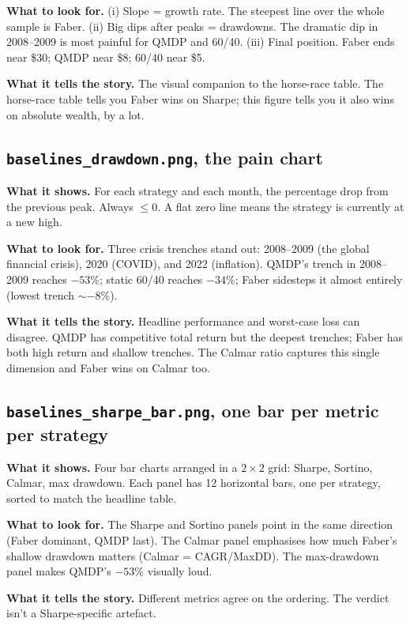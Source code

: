 \documentclass[11pt]{article}
\begin{document}
\textbf{What to look for.} (i) Slope = growth rate. The steepest line over the whole sample is Faber. (ii) Big dips after peaks = drawdowns. The dramatic dip in 2008--2009 is most painful for QMDP and 60/40. (iii) Final position. Faber ends near \$30; QMDP near \$8; 60/40 near \$5.

\textbf{What it tells the story.} The visual companion to the horse-race table. The horse-race table tells you Faber wins on Sharpe; this figure tells you it also wins on absolute wealth, by a lot.

\subsection{\texttt{baselines\_drawdown.png}, the pain chart}

\textbf{What it shows.} For each strategy and each month, the percentage drop from the previous peak. Always $\leq 0$. A flat zero line means the strategy is currently at a new high.

\textbf{What to look for.} Three crisis trenches stand out: 2008--2009 (the global financial crisis), 2020 (COVID), and 2022 (inflation). QMDP's trench in 2008--2009 reaches $-53\%$; static 60/40 reaches $-34\%$; Faber sidesteps it almost entirely (lowest trench $\sim -8\%$).

\textbf{What it tells the story.} Headline performance and worst-case loss can disagree. QMDP has competitive total return but the deepest trenches; Faber has both high return and shallow trenches. The Calmar ratio captures this single dimension and Faber wins on Calmar too.

\subsection{\texttt{baselines\_sharpe\_bar.png}, one bar per metric per strategy}

\textbf{What it shows.} Four bar charts arranged in a $2 \times 2$ grid: Sharpe, Sortino, Calmar, max drawdown. Each panel has 12 horizontal bars, one per strategy, sorted to match the headline table.

\textbf{What to look for.} The Sharpe and Sortino panels point in the same direction (Faber dominant, QMDP last). The Calmar panel emphasises how much Faber's shallow drawdown matters (Calmar = CAGR/MaxDD). The max-drawdown panel makes QMDP's $-53\%$ visually loud.

\textbf{What it tells the story.} Different metrics agree on the ordering. The verdict isn't a Sharpe-specific artefact.
\end{document}
